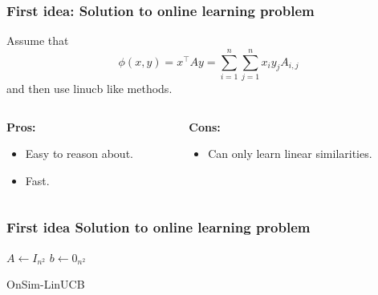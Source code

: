 \documentclass{beamer}
\begin{document}
\begin{frame}{}
    \frametitle{First idea: Solution to online learning problem}
    Assume that
    \[\phi(x, y) = x^\top A y = \sum_{i =1}^n\sum_{j=1}^n x_i y_j A_{i,j} \]
    and then use linucb like methods.

    \vspace{1cm}
    \begin{columns}
        \begin{column}{0.5\textwidth}
            \textbf{Pros:}
            \begin{itemize}
                \item Easy to reason about.
                \item Fast.
            \end{itemize}
            \end{column}

            \begin{column}{0.5\textwidth}
            \textbf{Cons:}
            \begin{itemize}
                \item Can only learn linear similarities.
            \end{itemize}
            \end{column}
    \end{columns}
\end{frame}

\begin{frame}{}
    \frametitle{First idea Solution to online learning problem}
    {\small
    \begin{algorithm}[H]
          $A \gets I_{n^2}$\;
          $b \gets 0_{n^2}$\;
        \caption{OnSim-LinUCB}\label{algo:active-linucb}

      \end{algorithm}
    }
\end{frame}
\end{document}
